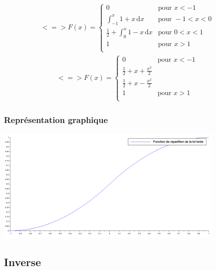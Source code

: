 \documentclass{article}
\begin{document}
\begin{align}
<=>
F(x)=\left\{
	\begin{array}{llll}
		0 &\mbox{pour } x<-1\\
		\displaystyle \int_{-1 }^{x} 1+x \, \mathrm{d}x &\mbox{pour } -1<x<0\\
		\frac{1}{2}+\displaystyle \int_{0}^{x} 1-x \, \mathrm{d}x &\mbox{pour } 0<x<1\\
		1 &\mbox{pour } x>1\\
	\end{array}
\right. 
\end{align}
\begin{align}
<=>
F(x)=\left\{
	\begin{array}{llll}
		0 & \mbox{pour } x<-1\\
		\frac{1}{2} + x + \frac{x^2}{2}\\
		\frac{1}{2} + x - \frac{x^2}{2}\\
		1 & \mbox{pour } x>1\\
	\end{array}
\right.
\end{align}



\subsubsection{Représentation graphique}
\begin{center}
\includegraphics[width=425px]{img/tente_repartition.png} %
\end{center}
\paragraph{}

\subsection{Inverse}
\end{document}
